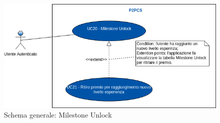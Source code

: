 \begin{figure}[h]
	\includegraphics[width=15cm]{res/images/uc20-21.png}
	\centering
	\caption{Schema generale: Milestone Unlock}
\end{figure}
